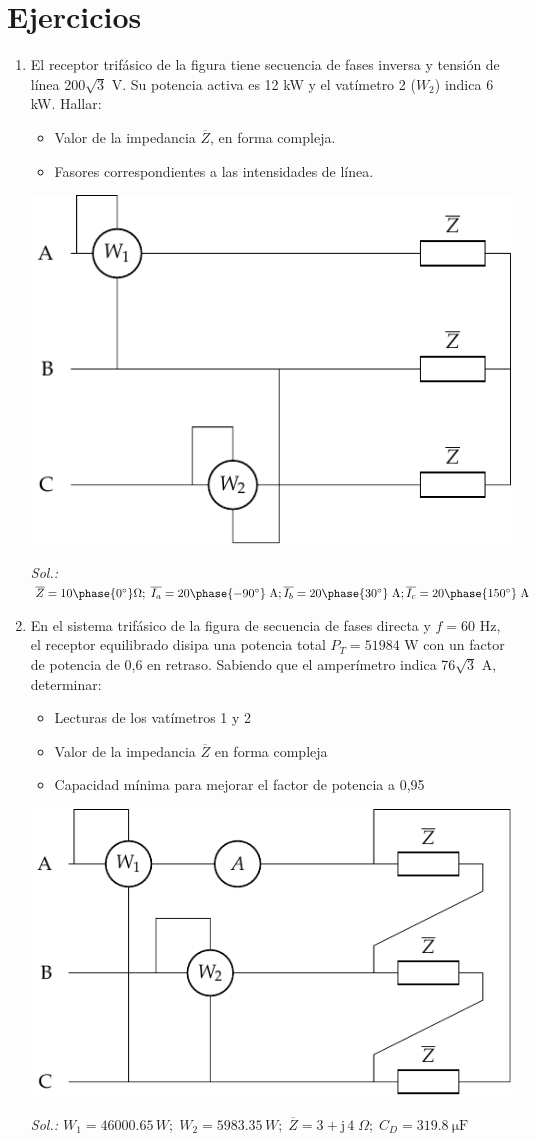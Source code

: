 \section*{Ejercicios}
\begin{enumerate}

\item El receptor trifásico de la figura tiene secuencia de fases
  inversa y tensión de línea 200$\sqrt{3}$ V. Su potencia activa es 12
  kW y el vatímetro 2 ($W_2$) indica 6 kW. Hallar:
  \begin{itemize}
  \item Valor de la impedancia $\overline{Z}$, en forma compleja.
  \item Fasores correspondientes a las intensidades de línea.
  \end{itemize}

\begin{center}
  \includegraphics[width=0.45\linewidth]{../figs/ej6_BT3.pdf}
\end{center}

\emph{Sol.:
  $\overline{Z}=10\phase{0^\circ}\Omega;\;
  \overline{I_a}={20\phase{-90^\circ}\;\text{A}};
  \overline{I_b}={20\phase{30^\circ}\;\text{A}};
  \overline{I_c}={20\phase{150^\circ}\;\text{A}}$}


\item En el sistema trifásico de la figura de secuencia de fases
  directa y $f=60$ Hz, el receptor equilibrado disipa una potencia
  total $P_T =51984$ W con un factor de potencia de 0,6 en
  retraso. Sabiendo que el amperímetro indica 76$\sqrt{3}$ A,
  determinar:
  \begin{itemize}
  \item Lecturas de los vatímetros 1 y 2
  \item Valor de la impedancia $\overline{Z}$ en forma compleja
  \item Capacidad mínima para mejorar el factor de potencia a 0,95
  \end{itemize}
  \begin{center}
    \includegraphics[width=0.5\linewidth]{../figs/ej4_BT3.pdf}
  \end{center}
  \emph{Sol.:
    $ W_1=46000.65\,W;\; W_2=5983.35\,W;\;
    \overline{Z}=3+\mathrm{j}\,4\;\Omega;\; C_D=\qty{319.8}{\micro\farad}$}


\end{enumerate}
